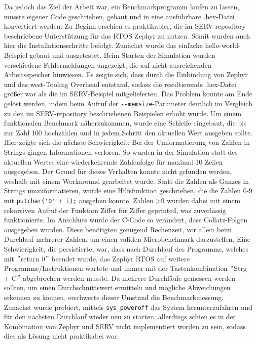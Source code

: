     Da jedoch das Ziel der Arbeit war, ein Benchmarkprogramm laufen zu lassen, musste eigener Code geschrieben, gebaut und in eine ausführbare .hex-Datei konvertiert werden.
    Zu Beginn erschien es praktikabler, die im SERV-repository beschriebene Unterstützung für das RTOS Zephyr zu nutzen.
    Somit wurden auch hier die Installationsschritte \parencite{zephyr-getting-started} befolgt.
    Zunächst wurde das einfache hello-world-Beispiel gebaut und ausgetestet.
    Beim Starten der Simulation wurden verschiedene Fehlermeldungen angezeigt, die auf nicht ausreichenden Arbeitsspeicher hinwiesen.
    Es zeigte sich, dass durch die Einbindung von Zephyr und das west-Tooling Overhead entstand, sodass die resultierende .hex-Datei größer war als die im SERV-Beispiel mitgelieferten.
    Das Problem konnte am Ende gelöst werden, indem beim Aufruf der \verb|--memsize|-Parameter deutlich im Vergleich zu den im SERV-repository beschriebenen Beispielen erhöht wurde.
    Um einem funktionalen Benchmark näherzukommen, wurde eine Schleife eingebaut, die bis zur Zahl 100 hochzählen und in jedem Schritt den aktuellen Wert ausgeben sollte.
    Hier zeigte sich die nächste Schwierigkeit: Bei der Umformatierung von Zahlen in Strings gingen Informationen verloren.
    So wurden in der Simulation statt des aktuellen Wertes eine wiederkehrende Zahlenfolge für maximal 10 Zeilen ausgegeben.
    Der Grund für dieses Verhalten konnte nicht gefunden werden, weshalb mit einem Workaround gearbeitet wurde.
    Statt die Zahlen als Ganzes in Strings umzuformatieren, wurde eine Hilfsfunktion geschrieben, die die Zahlen 0-9 mit \verb|putchar('0' + i);| ausgeben konnte.
    Zahlen >9 wurden dabei mit einem rekursiven Aufruf der Funktion Ziffer für Ziffer geprinted, was zuverlässig funktionierte.
    Im Anschluss wurde der C-Code so verändert, dass Collatz-Folgen ausgegeben wurden.
    Diese benötigten genügend Rechenzeit, vor allem beim Durchlauf mehrerer Zahlen, um einen validen Microbenchmark darzustellen.
    Eine Schwierigkeit, die persistierte, war, dass nach Durchlauf des Programms, welches mit \("\)return 0\("\) beendet wurde, das Zephyr RTOS auf weitere Programme/Instruktionen wartete und immer mit der Tastenkombination \("\)Strg + C\("\) abgebrochen werden musste.
    Da mehrere Durchläufe gemessen werden sollten, um einen Durchschnittswert ermitteln und mögliche Abweichungen erkennen zu können, erschwerte dieser Umstand die Benchmarkmessung.
    Zunächst wurde probiert, mittels \verb|sys_poweroff| das System herunterzufahren und für den nächsten Durchlauf wieder neu zu starten, allerdings schien es in der Kombination von Zephyr und SERV nicht implementiert worden zu sein, sodass dies als Lösung nicht praktikabel war.
